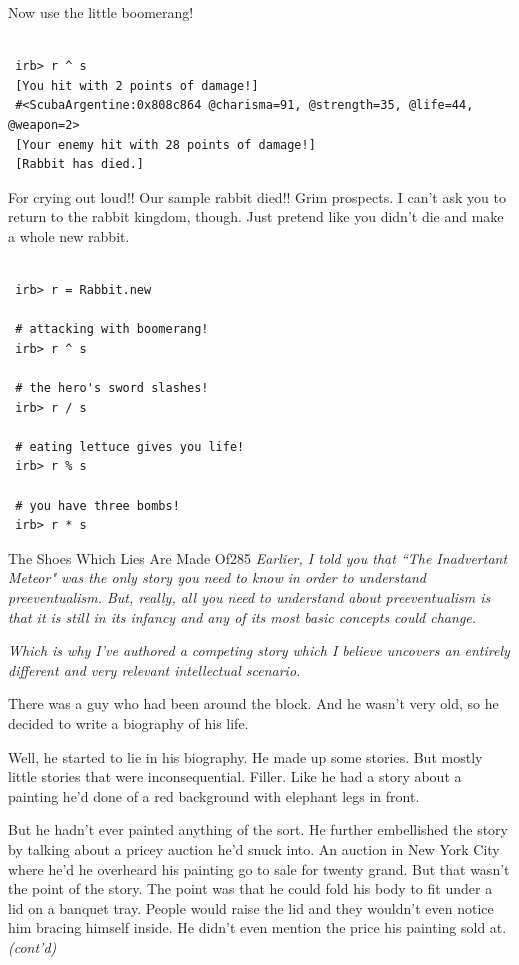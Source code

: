 \documentclass[10pt,twoside]{report}
\begin{document}
Now use the little boomerang!


\begin{lstlisting}

 irb> r ^ s
 [You hit with 2 points of damage!]
 #<ScubaArgentine:0x808c864 @charisma=91, @strength=35, @life=44, @weapon=2>
 [Your enemy hit with 28 points of damage!]
 [Rabbit has died.]

\end{lstlisting}


For crying out loud!!  Our sample rabbit died!!  Grim prospects.  I
can't ask you to return to the rabbit kingdom, though. Just pretend
like you didn't die and make a whole new rabbit.


\begin{lstlisting}

 irb> r = Rabbit.new

 # attacking with boomerang!
 irb> r ^ s

 # the hero's sword slashes!
 irb> r / s

 # eating lettuce gives you life!
 irb> r % s

 # you have three bombs!
 irb> r * s

\end{lstlisting}


	\begin{sidebar}{The Shoes Which Lies Are Made Of}{285}
		\textit{Earlier, I told you that ``The Inadvertant Meteor" was the only story you need to know in order to understand preeventualism. But, really, all you need to understand about preeventualism is that it is still in its infancy and any of its most basic concepts could change.}\vspace{6pt}
		
		\textit{Which is why I've authored a competing story which I believe uncovers an entirely different and very relevant intellectual scenario.}\vspace{6pt}

		There was a guy who had been around the block. And he wasn't very old, so he decided to write a biography of his life.\vspace{6pt}

		Well, he started to lie in his biography. He made up some stories. But mostly little stories that were inconsequential. Filler. Like he had a story about a painting he'd done of a red background with elephant legs in front.\vspace{6pt}

		But he hadn't ever painted anything of the sort. He further embellished the story by talking about a pricey auction he'd snuck into. An auction in New York City where he'd he overheard his painting go to sale for twenty grand. But that wasn't the point of the story. The point was that he could fold his body to fit under a lid on a banquet tray. People would raise the lid and they wouldn't even notice him bracing himself inside. He didn't even mention the price his painting sold at. \textit{(cont'd)}
	\end{sidebar}
\end{document}
